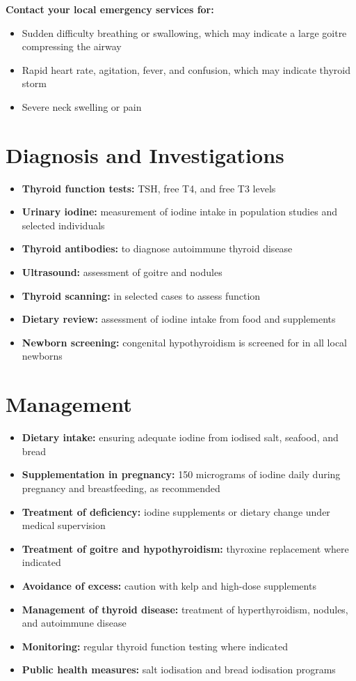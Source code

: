 \textbf{Contact your local emergency services for:}
\begin{itemize}
    \item Sudden difficulty breathing or swallowing, which may indicate a large goitre compressing the airway
    \item Rapid heart rate, agitation, fever, and confusion, which may indicate thyroid storm
    \item Severe neck swelling or pain
\end{itemize}

\section*{Diagnosis and Investigations}
\begin{itemize}
    \item \textbf{Thyroid function tests:} TSH, free T4, and free T3 levels
    \item \textbf{Urinary iodine:} measurement of iodine intake in population studies and selected individuals
    \item \textbf{Thyroid antibodies:} to diagnose autoimmune thyroid disease
    \item \textbf{Ultrasound:} assessment of goitre and nodules
    \item \textbf{Thyroid scanning:} in selected cases to assess function
    \item \textbf{Dietary review:} assessment of iodine intake from food and supplements
    \item \textbf{Newborn screening:} congenital hypothyroidism is screened for in all local newborns
\end{itemize}

\section*{Management}
\begin{itemize}
    \item \textbf{Dietary intake:} ensuring adequate iodine from iodised salt, seafood, and bread
    \item \textbf{Supplementation in pregnancy:} 150 micrograms of iodine daily during pregnancy and breastfeeding, as recommended
    \item \textbf{Treatment of deficiency:} iodine supplements or dietary change under medical supervision
    \item \textbf{Treatment of goitre and hypothyroidism:} thyroxine replacement where indicated
    \item \textbf{Avoidance of excess:} caution with kelp and high-dose supplements
    \item \textbf{Management of thyroid disease:} treatment of hyperthyroidism, nodules, and autoimmune disease
    \item \textbf{Monitoring:} regular thyroid function testing where indicated
    \item \textbf{Public health measures:} salt iodisation and bread iodisation programs
\end{itemize}

